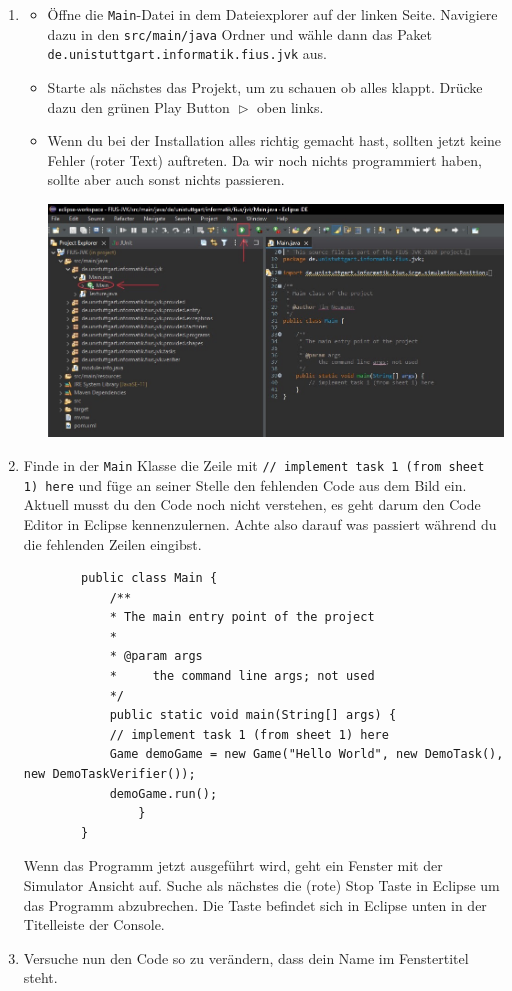 \begin{enumerate}
    \item
    \begin{itemize}
        \item Öffne die \texttt{Main}-Datei in dem Dateiexplorer auf der linken Seite.
            Navigiere dazu in den \texttt{src/main/java} Ordner und wähle dann das Paket \texttt{de.unistuttgart.informatik.fius.jvk} aus.
        \item Starte als nächstes das Projekt, um zu schauen ob alles klappt.
            Drücke dazu den grünen Play Button $\vartriangleright$ oben links.
        \item Wenn du bei der Installation alles richtig gemacht hast, sollten jetzt keine Fehler (roter Text) auftreten.
            Da wir noch nichts programmiert haben, sollte aber auch sonst nichts passieren.
        \begin{center}
            \includegraphics[width=\linewidth]{./figures/ide.jpg}
        \end{center}
    \end{itemize}

    \item Finde in der \lstinline{Main} Klasse die Zeile mit \lstinline{// implement task 1 (from sheet 1) here} und füge an seiner Stelle den fehlenden Code aus dem Bild ein.
    Aktuell musst du den Code noch nicht verstehen, es geht darum den Code Editor in Eclipse kennenzulernen.
    Achte also darauf was passiert während du die fehlenden Zeilen eingibst.

    \begin{lstlisting}
        public class Main {
            /**
            * The main entry point of the project
            *
            * @param args
            *     the command line args; not used
            */
            public static void main(String[] args) {
            // implement task 1 (from sheet 1) here
            Game demoGame = new Game("Hello World", new DemoTask(), new DemoTaskVerifier());
            demoGame.run();
                }
        }   
    \end{lstlisting}

    Wenn das Programm jetzt ausgeführt wird, geht ein Fenster mit der Simulator Ansicht auf.
    Suche als nächstes die (rote) Stop Taste in Eclipse um das Programm abzubrechen.
    Die Taste befindet sich in Eclipse unten in der Titelleiste der Console.
    \item Versuche nun den Code so zu verändern, dass dein Name im Fenstertitel steht.
\end{enumerate}


